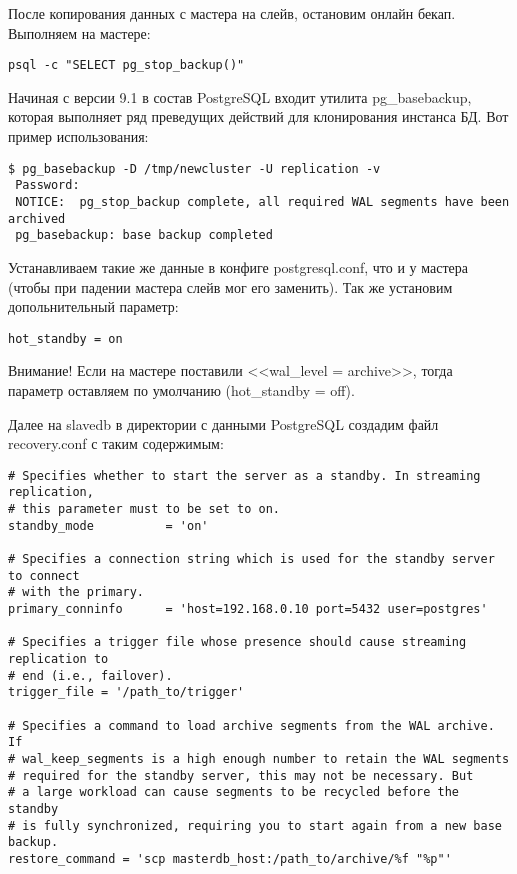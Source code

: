 После копирования данных с мастера на слейв, остановим онлайн бекап. Выполняем на мастере:
\begin{lstlisting}[label=lst:streaming12,caption=Выполняем на мастере]
psql -c "SELECT pg_stop_backup()"
\end{lstlisting}

Начиная с версии 9.1 в состав PostgreSQL входит утилита pg\_basebackup, которая выполняет ряд преведущих действий для клонирования 
инстанса БД. Вот пример использования:
\begin{lstlisting}[label=lst:streaming13,caption=Пример использования pg\_basebackup]
$ pg_basebackup -D /tmp/newcluster -U replication -v
 Password: 
 NOTICE:  pg_stop_backup complete, all required WAL segments have been archived
 pg_basebackup: base backup completed
\end{lstlisting}

Устанавливаем такие же данные в конфиге postgresql.conf, что и у мастера (чтобы при падении мастера слейв мог его заменить). 
Так же установим допольнительный параметр:
\begin{lstlisting}[label=lst:streaming13,caption=Конфиг слейва]
hot_standby = on
\end{lstlisting}
Внимание! Если на мастере поставили <<wal\_level = archive>>, тогда параметр оставляем по умолчанию (hot\_standby = off).

Далее на slavedb в директории с данными PostgreSQL создадим файл recovery.conf с таким содержимым:
\begin{lstlisting}[label=lst:streaming14,caption=Конфиг recovery.conf]
# Specifies whether to start the server as a standby. In streaming replication,
# this parameter must to be set to on.
standby_mode          = 'on'

# Specifies a connection string which is used for the standby server to connect
# with the primary.
primary_conninfo      = 'host=192.168.0.10 port=5432 user=postgres'

# Specifies a trigger file whose presence should cause streaming replication to
# end (i.e., failover).
trigger_file = '/path_to/trigger'

# Specifies a command to load archive segments from the WAL archive. If
# wal_keep_segments is a high enough number to retain the WAL segments
# required for the standby server, this may not be necessary. But
# a large workload can cause segments to be recycled before the standby
# is fully synchronized, requiring you to start again from a new base backup.
restore_command = 'scp masterdb_host:/path_to/archive/%f "%p"'
\end{lstlisting}

